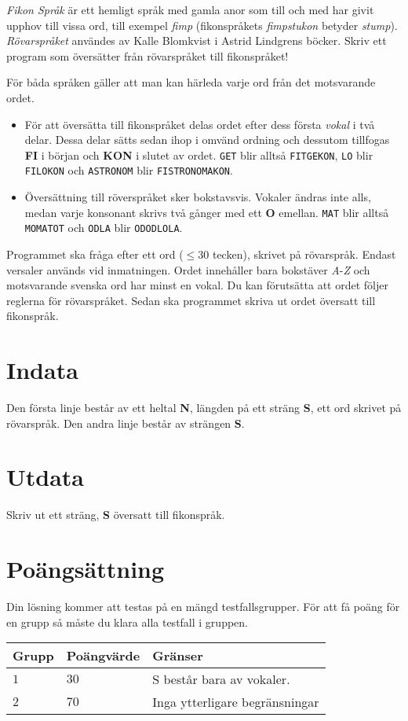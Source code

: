 \textit{Fikon Språk} är ett hemligt språk med gamla anor som till och med har givit upphov till vissa ord, till exempel \textit{fimp} (fikonspråkets \textit{fimpstukon} betyder \textit{stump}). \textit{Rövarspråket} användes av Kalle Blomkvist i Astrid Lindgrens böcker. Skriv ett program som översätter från rövarspråket till fikonspråket!

För båda språken gäller att man kan härleda varje ord från det motsvarande ordet. 

\begin{itemize}
        \item För att översätta till fikonspråket delas ordet efter dess första \textit{vokal} i två delar. Dessa delar sätts sedan ihop i omvänd ordning och dessutom tillfogas \textbf{FI} i början och \textbf{KON} i slutet av ordet. \texttt{GET} blir alltså \texttt{FITGEKON}, \texttt{LO} blir \texttt{FILOKON} och \texttt{ASTRONOM} blir \texttt{FISTRONOMAKON}.
        \item Översättning till röverspråket sker bokstavsvis. Vokaler ändras inte alls, medan varje konsonant skrivs två gånger med ett \textbf{O} emellan. \texttt{MAT} blir alltså \texttt{MOMATOT} och \texttt{ODLA} blir \texttt{ODODLOLA}.
\end{itemize}

Programmet ska fråga efter ett ord ($\leq 30$ tecken), skrivet på rövarspråk. Endast versaler används vid inmatningen. Ordet innehåller bara bokstäver \textit{A}-\textit{Z} och motsvarande svenska ord har minst en vokal. Du kan förutsätta att ordet följer reglerna för rövarspråket. Sedan ska programmet skriva ut ordet översatt till fikonspråk.

\section*{Indata}
Den första linje består av ett heltal \textbf{N}, längden på ett sträng \textbf{S}, ett ord skrivet på rövarspråk.
Den andra linje består av strängen \textbf{S}. 

\section*{Utdata}
Skriv ut ett sträng, \textbf{S} översatt till fikonspråk.

\section*{Poängsättning}
Din lösning kommer att testas på en mängd testfallsgrupper. För att få poäng för en grupp så måste du klara alla testfall i gruppen.


\noindent
\begin{tabular}{| l | l | p{12cm} |}
  \hline
  Grupp & Poängvärde & Gränser \\ \hline
  $1$   & $30$       & S består bara av vokaler. \\ \hline
  $2$   & $70$       & Inga ytterligare begränsningar \\ \hline
\end{tabular}
